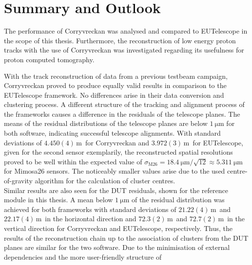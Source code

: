\chapter{Summary and Outlook}
The performance of Corryvreckan was analysed and compared to EUTelescope in the scope of this thesis. Furthermore, the reconstruction of low energy proton
tracks with the use of Corryvreckan was investigated regarding its usefulness for proton computed tomography.

With the track reconstruction of data from a previous testbeam campaign, Corryvreckan proved to
produce equally valid results in comparison to the EUTelescope framework. No differences
arise in their data conversion and clustering process.
A different structure of the tracking and alignment process of the frameworks causes a difference in the residuals
of the telescope planes. The means of the residual distributions of the telescope planes
are below $\SI{1}{\micro\meter}$ for both software, indicating successful telescope alignments.
With standard deviations of $4.450(4)$\,\textmu m\, for Corryvreckan and $3.972(3)$\,\textmu m\, for EUTelescope, given for the second sensor exemplarily, the
reconstructed spatial resolutions proved to be well within
the expected value of $\sigma_{\text{M26}} = \SI{18.4}{\micro\meter}/\sqrt{12} \approx \SI{5.311}{\micro\meter}$ for Mimosa26 sensors. The noticeably smaller values
arise due to the used centre-of-gravity algorithm for the calculation of cluster centres. \\
Similar results are also seen for the DUT residuals, shown for the reference module in this thesis.
A mean below $\SI{1}{\micro\meter}$ of the residual distribution was achieved for both frameworks with standard deviations of $21.22(4)$\,\textmu m\, and $22.17(4)$\,\textmu m\, in the horizontal direction and
$72.3(2)$\,\textmu m\, and $72.7(2)$\,\textmu m\, in the vertical direction for Corryvreckan and EUTelescope, respectively.
Thus, the results of the reconstruction chain up to the
association of clusters from the DUT planes are similar for the two software. Due to the minimisation of external dependencies and the more user-friendly structure of
